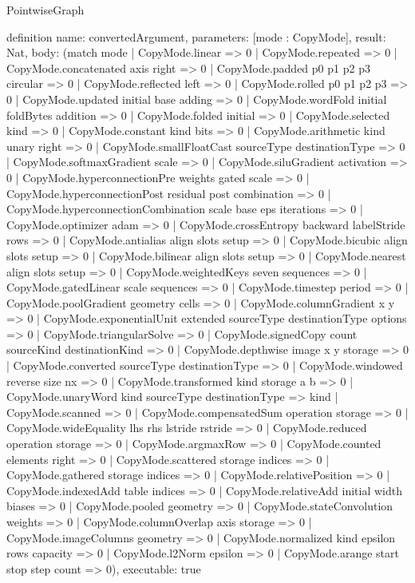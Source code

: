 \begin{lexlean}{PointwiseGraph}
\begin{semanticmodule}
definition{
  name: convertedArgument,
  parameters: [mode : CopyMode],
  result: Nat,
  body: (match mode
    | CopyMode.linear => 0
    | CopyMode.repeated => 0
    | CopyMode.concatenated axis right => 0
    | CopyMode.padded p0 p1 p2 p3 circular => 0
    | CopyMode.reflected left => 0
    | CopyMode.rolled p0 p1 p2 p3 => 0
    | CopyMode.updated initial base adding => 0
    | CopyMode.wordFold initial foldBytes addition => 0
    | CopyMode.folded initial => 0
    | CopyMode.selected kind => 0
    | CopyMode.constant kind bits => 0
    | CopyMode.arithmetic kind unary right => 0
    | CopyMode.smallFloatCast sourceType destinationType => 0
    | CopyMode.softmaxGradient scale => 0
    | CopyMode.siluGradient activation => 0
    | CopyMode.hyperconnectionPre weights gated scale => 0
    | CopyMode.hyperconnectionPost residual post combination => 0
    | CopyMode.hyperconnectionCombination scale base eps iterations => 0
    | CopyMode.optimizer adam => 0
    | CopyMode.crossEntropy backward labelStride rows => 0
    | CopyMode.antialias align slots setup => 0
    | CopyMode.bicubic align slots setup => 0
    | CopyMode.bilinear align slots setup => 0
    | CopyMode.nearest align slots setup => 0
    | CopyMode.weightedKeys seven sequences => 0
    | CopyMode.gatedLinear scale sequences => 0
    | CopyMode.timestep period => 0
    | CopyMode.poolGradient geometry cells => 0
    | CopyMode.columnGradient x y => 0
    | CopyMode.exponentialUnit extended sourceType destinationType options => 0
    | CopyMode.triangularSolve => 0
    | CopyMode.signedCopy count sourceKind destinationKind => 0
    | CopyMode.depthwise image x y storage => 0
    | CopyMode.converted sourceType destinationType => 0
    | CopyMode.windowed reverse size nx => 0
    | CopyMode.transformed kind storage a b => 0
    | CopyMode.unaryWord kind sourceType destinationType => kind
    | CopyMode.scanned => 0
    | CopyMode.compensatedSum operation storage => 0
    | CopyMode.wideEquality lhs rhs lstride rstride => 0
    | CopyMode.reduced operation storage => 0
    | CopyMode.argmaxRow => 0
    | CopyMode.counted elements right => 0
    | CopyMode.scattered storage indices => 0
    | CopyMode.gathered storage indices => 0
    | CopyMode.relativePosition => 0
    | CopyMode.indexedAdd table indices => 0
    | CopyMode.relativeAdd initial width biases => 0
    | CopyMode.pooled geometry => 0
    | CopyMode.stateConvolution weights => 0
    | CopyMode.columnOverlap axis storage => 0
    | CopyMode.imageColumns geometry => 0
    | CopyMode.normalized kind epsilon rows capacity => 0
    | CopyMode.l2Norm epsilon => 0
    | CopyMode.arange start stop step count => 0),
  executable: true
}


\end{semanticmodule}
\end{lexlean}
